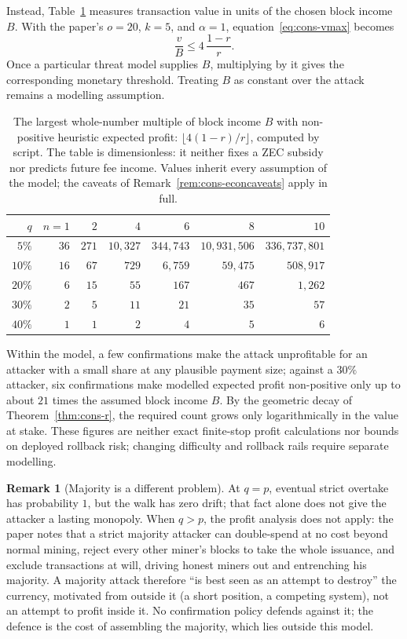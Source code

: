 \documentclass[11pt,a4paper]{article}
\theoremstyle{definition}
\newtheorem{remark}[theorem]{Remark}
\begin{document}
Instead, Table~\ref{tab:cons-vmax} measures transaction value in units of
the chosen block income $B$. With the paper's $o=20$, $k=5$, and
$\alpha=1$, equation~\eqref{eq:cons-vmax} becomes
\[
  \frac{v}{B}\leq4\,\frac{1-r}{r}.
\]
Once a particular threat model supplies $B$, multiplying by it gives the
corresponding monetary threshold. Treating $B$ as constant over the attack
remains a modelling assumption.

\begin{table}[ht]
\centering
\small
\begin{tabular}{@{}r rrrrrr@{}}
\toprule
$q$ & $n{=}1$ & $2$ & $4$ & $6$ & $8$ & $10$ \\
\midrule
$5\%$ & $36$ & $271$ & $10{,}327$ & $344{,}743$ &
  $10{,}931{,}506$ & $336{,}737{,}801$ \\
$10\%$ & $16$ & $67$ & $729$ & $6{,}759$ & $59{,}475$ & $508{,}917$ \\
$20\%$ & $6$ & $15$ & $55$ & $167$ & $467$ & $1{,}262$ \\
$30\%$ & $2$ & $5$ & $11$ & $21$ & $35$ & $57$ \\
$40\%$ & $1$ & $1$ & $2$ & $4$ & $5$ & $6$ \\
\bottomrule
\end{tabular}
\caption{The largest whole-number multiple of block income $B$ with
non-positive heuristic expected profit:
$\lfloor4(1-r)/r\rfloor$, computed by script. The table is dimensionless:
it neither fixes a ZEC subsidy nor predicts future fee income. Values
inherit every assumption of the model; the caveats of
Remark~\ref{rem:cons-econcaveats} apply in full.}
\label{tab:cons-vmax}
\end{table}

Within the model, a few confirmations make the attack unprofitable for an
attacker with a small share at any plausible payment size; against a
$30\%$ attacker, six confirmations make modelled expected profit
non-positive only up to about $21$ times the assumed block income $B$. By
the geometric decay of Theorem~\ref{thm:cons-r}, the required count grows
only logarithmically in the value at stake. These figures are neither
exact finite-stop profit calculations nor bounds on deployed rollback
risk; changing difficulty and rollback rails require separate modelling.

\begin{remark}[Majority is a different problem]\label{rem:cons-majority}
At $q=p$, eventual strict overtake has probability $1$, but the walk has zero
drift; that fact alone does not give the attacker a lasting monopoly. When
$q>p$, the profit analysis does not apply: the paper notes that a strict
majority attacker can double-spend at no cost beyond normal mining, reject
every other miner's blocks to take the whole issuance, and exclude
transactions at will, driving honest miners out and entrenching his
majority. A majority attack therefore ``is best seen as an attempt to destroy''
the currency, motivated from outside it (a short position, a competing
system), not an attempt to profit inside it. No confirmation policy
defends against it; the defence is the cost of assembling the majority,
which lies outside this model.
\end{remark}
\end{document}
